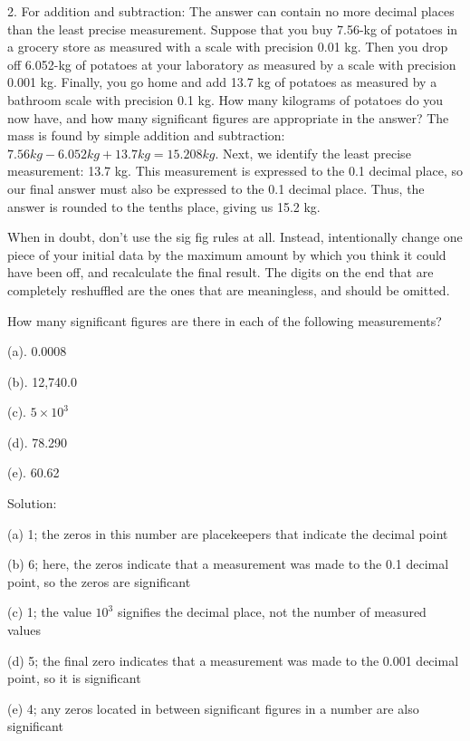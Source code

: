 2. For addition and subtraction: The answer can contain no more decimal places than the least precise measurement. Suppose that you buy
7.56-kg of potatoes in a grocery store as measured with a scale with precision 0.01 kg. Then you drop off 6.052-kg of potatoes at your laboratory as measured by a scale with precision 0.001 kg. Finally, you go home and add 13.7 kg of potatoes as measured by a bathroom scale with precision 0.1 kg. How many kilograms of potatoes do you now have, and how many significant figures are appropriate in the answer? The mass is found by simple addition and subtraction: $7.56 kg - 6.052 kg +13.7 kg= 15.208 kg$. 
Next, we identify the least precise measurement: 13.7 kg. This measurement is expressed to the 0.1 decimal place, so our final answer must also be expressed to the 0.1 decimal place. Thus, the answer is rounded to the tenths place, giving us 15.2 kg.

When in doubt, don't use the sig fig rules at all. Instead,
intentionally change one piece of your initial data by the
maximum amount by which you think it could have been off,
and recalculate the final result. The digits on the end that
are completely reshuffled are the ones that are meaningless,
and should be omitted.

\begin{exmp}
How many significant figures are there in each of the
following measurements?

(a). 0.0008

(b). 12,740.0

(c). $5 \times 10^3$

(d). 78.290

(e). 60.62

Solution:

(a) 1; the zeros in this number are placekeepers that indicate the decimal point

(b) 6; here, the zeros indicate that a measurement was made to the 0.1 decimal point, so the zeros are significant

(c) 1; the value $10^3$ signifies the decimal place, not the number of measured values

(d) 5; the final zero indicates that a measurement was made to the 0.001 decimal point, so it is significant

(e) 4; any zeros located in between significant figures in a number are also significant

\end{exmp}
\divider





